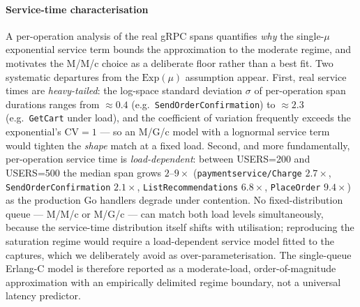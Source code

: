 \documentclass[ASNA,twocolumn]{USG}
\begin{document}
    \paragraph{Service-time characterisation} A per-operation analysis of
    the real gRPC spans
    quantifies \emph{why} the single-$\mu$ exponential service term bounds
    the approximation to the moderate regime, and motivates the
    M/M/c choice as a deliberate floor rather than a best fit. Two
    systematic departures from the $\textrm{Exp}(\mu)$ assumption appear.
    First, real service times are \emph{heavy-tailed}: the log-space
    standard deviation $\sigma$ of per-operation span durations ranges from
    $\approx\!0.4$ (e.g.\ \texttt{SendOrderConfirmation}) to $\approx\!2.3$
    (e.g.\ \texttt{GetCart} under load), and the coefficient of variation
    frequently exceeds the exponential's $\textrm{CV}=1$ --- so an
    M/G/c model with a lognormal service term would tighten the
    \emph{shape} match at a fixed load. Second, and more fundamentally,
    per-operation service time is \emph{load-dependent}: between USERS=200
    and USERS=500 the median span grows $2$--$9\times$
    (\texttt{paymentservice/Charge} $2.7\times$,
    \texttt{SendOrderConfirmation} $2.1\times$,
    \texttt{ListRecommendations} $6.8\times$, \texttt{PlaceOrder}
    $9.4\times$) as the production Go handlers degrade under contention.
    No fixed-distribution queue --- M/M/c or M/G/c --- can match both load
    levels simultaneously, because the service-time distribution itself
    shifts with utilisation; reproducing the saturation regime would
    require a load-dependent service model fitted to the captures, which
    we deliberately avoid as over-parameterisation. The single-queue
    Erlang-C model is therefore reported as a moderate-load,
    order-of-magnitude approximation with an empirically delimited regime
    boundary, not a universal latency predictor.
\end{document}
